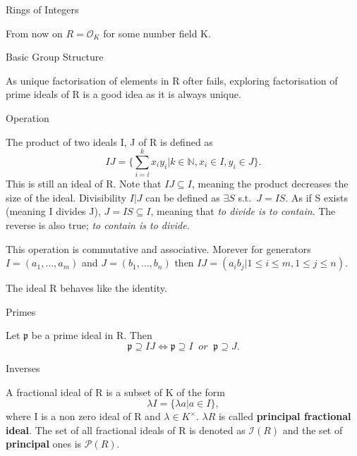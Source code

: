 \documentclass[12pt, letterpaper]{article}
\newcommand{\N}{\mathbb{N}}
\newcommand{\Ok}{\mathcal{O}}
\newcommand{\p}{\mathfrak{p}}
\begin{document}
\begin{section}{Rings of Integers}

  From now on \(R = \Ok_{K}\) for some number field K.

  \begin{subsection}{Basic Group Structure}

    As unique factorisation of elements in R ofter fails, exploring
    factorisation of prime ideals of R is a good idea as it is always unique.

    \begin{subsubsection}{Operation}

      The product of two ideals I, J of R is defined as
      \[IJ = \{ \sum^{k}_{i = i} x_{i}y_{i} | k \in \N, x_{i} \in I,
        y_{i} \in J \}.\] This is still an ideal of R. Note that \(IJ \subseteq
      I\), meaning the product decreases the size of the ideal. Divisibility
      \(I | J\) can be defined as \(\exists S\) s.t.\ \(J = IS\). As if S
      exists (meaning I divides J), \(J = IS \subseteq I\), meaning that
      \textit{to divide is to contain}. The reverse is also true;
      \textit{to contain is to divide}.

      This operation is commutative and associative. Morever for generators
      \(I = (a_{1}, \dots , a_{m})\) and \(J = (b_{1}, \dots , b_{n})\) then
      \(IJ = (a_{i}b_{j} | 1 \leq i \leq m, 1 \leq j \leq n)\).

      The ideal R behaves like the identity.

    \end{subsubsection}

    \begin{subsubsection}{Primes}

      Let \(\p\) be a prime ideal in R. Then \[\p \supseteq IJ \iff
        \p \supseteq I \;\; or \;\; \p \supseteq J.\]

    \end{subsubsection}

    \begin{subsubsection}{Inverses}

      A fractional ideal of R is a subset of K of the form \[\lambda I =
        \{ \lambda a | a \in I\},\] where I is a non zero ideal of R and
      \(\lambda \in K^{\times}\). \(\lambda R\) is called \textbf{principal
        fractional ideal}. The set of all fractional ideals of R is denoted
      as \(\mathcal{I}(R)\) and the set of \textbf{principal} ones is
      \(\mathcal{P}(R)\).


\end{subsubsection}
\end{subsection}
\end{section}
\end{document}
